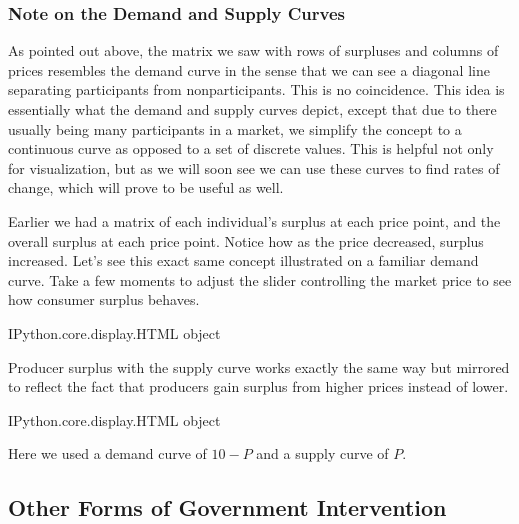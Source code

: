 \documentclass[letterpaper,10pt,english]{jupyterBook}
\begin{document}
\subsubsection{Note on the Demand and Supply Curves}
\label{\detokenize{content/03-public/surplus:note-on-the-demand-and-supply-curves}}
\sphinxAtStartPar
As pointed out above, the matrix we saw with rows of surpluses and columns of prices resembles the demand curve in the sense that we can see a diagonal line separating participants from non\sphinxhyphen{}participants. This is no coincidence. This idea is essentially what the demand and supply curves depict, except that due to there usually being many participants in a market, we simplify the concept to a continuous curve as opposed to a set of discrete values. This is helpful not only for visualization, but as we will soon see we can use these curves to find rates of change, which will prove to be useful as well.

\sphinxAtStartPar
Earlier we had a matrix of each individual’s surplus at each price point, and the overall surplus at each price point. Notice how as the price decreased, surplus increased. Let’s see this exact same concept illustrated on a familiar demand curve. Take a few moments to adjust the slider controlling the market price to see how consumer surplus behaves.

\begin{sphinxVerbatim}[commandchars=\\\{\}]
\PYGZlt{}IPython.core.display.HTML object\PYGZgt{}
\end{sphinxVerbatim}

\sphinxAtStartPar
Producer surplus with the supply curve works exactly the same way but mirrored to reflect the fact that producers gain surplus from higher prices instead of lower.

\begin{sphinxVerbatim}[commandchars=\\\{\}]
\PYGZlt{}IPython.core.display.HTML object\PYGZgt{}
\end{sphinxVerbatim}

\sphinxAtStartPar
Here we used a demand curve of \(10-P\) and a supply curve of \(P\).


\subsection{Other Forms of Government Intervention}
\label{\detokenize{content/03-public/govt-intervention:other-forms-of-government-intervention}}\label{\detokenize{content/03-public/govt-intervention::doc}}
\end{document}
